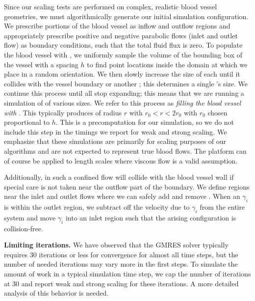 Since our scaling tests are performed on complex, realistic blood
vessel geometries, we must
algorithmically generate our initial simulation configuration.
We prescribe portions of the blood vessel as inflow and outflow regions and
appropriately prescribe positive and negative parabolic flows (inlet and outlet
flow) as boundary
conditions, such that the total fluid flux is zero.
To populate the blood vessel with \rbcs, we uniformly sample the volume of the 
bounding box of the vessel with a spacing $h$ to find point locations
inside the domain at which we place \rbcs in a random orientation.
We then slowly increase the size of each \rbc until it collides with the
vessel boundary or another \rbc; this determines a single \rbc's size.
We continue this process until all \rbcs stop expanding; this means that 
we are running a simulation of \rbcs of various sizes.
We refer to this process as \textit{filling the blood vessel with }\rbcs.
This typically produces \rbcs of radius $r$ with $r_0 < r < 2r_0$ with $r_0$ chosen proportional to $h$. 
This is a precomputation for our simulation, so we do not include this
step in the timings we report for weak and strong scaling.
We emphasize that these simulations are primarily for scaling purposes
of our algorithms and are not expected to represent true blood flows.
The platform can of course be applied to length scales where viscous
flow is a valid assumption.

Additionally, \rbcs in such a confined flow will collide with the
blood vessel wall
if special care is  not taken near the outflow part of the boundary.
We define regions near the inlet and outlet flows where we can safely add and
remove \rbcs.
When an \rbc $\gamma_i$ is within the outlet region, we subtract off the velocity due to
$\gamma_i$ from the entire system and move $\gamma_i$ into an inlet
region such that the arising \rbc
configuration is collision-free.

\textbf{Limiting  iterations. }
We have observed that the GMRES solver typically requires 30 iterations
or less for convergence for almost all time steps, but the number
of needed iterations may vary more in the first steps. 
To simulate the amount of work in a typical simulation time
step, we cap the number of \gmres iterations at 30 and report weak and strong
scaling for these iterations. A more detailed analysis of this behavior is needed.

